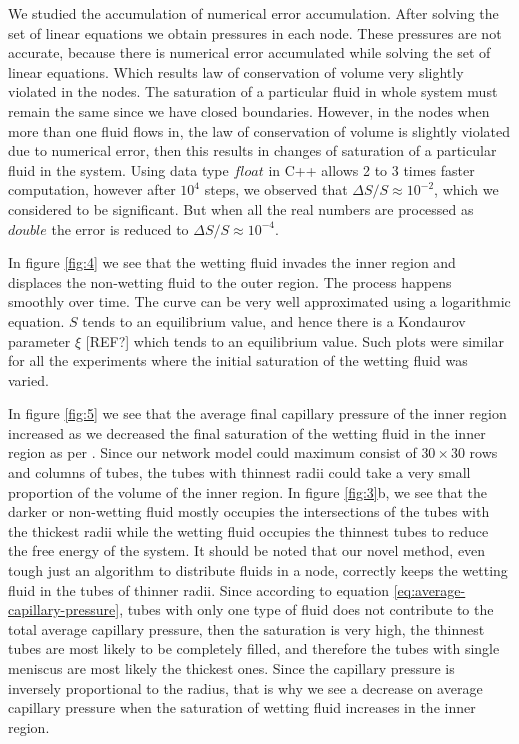 \documentclass[
	12pt
] {article}
\begin{document}
	We studied the accumulation of numerical error accumulation. After solving the set of linear equations we obtain pressures in each node. These pressures are not accurate, because there is numerical error accumulated while solving the set of linear equations. Which results law of conservation of volume very slightly violated in the nodes. The saturation of a particular fluid in whole system must remain the same since we have closed boundaries. However, in the nodes when more than one fluid flows in, the law of conservation of volume is slightly violated due to numerical error, then this results in changes of saturation of a particular fluid in the system. Using data type $float$ in C++ allows 2 to 3 times faster computation, however after $10^4$ steps, we observed that $\Delta S / S \approx 10^{-2}$, which we considered to be significant. But when all the real numbers are processed as $double$ the error is reduced to $\Delta S / S \approx 10^{-4}$.
	
	In figure \ref{fig:4} we see that the wetting fluid invades the inner region and displaces the non-wetting fluid to the outer region. The process happens smoothly over time. The curve can be very well approximated using a logarithmic equation. $S$ tends to an equilibrium value, and hence there is a Kondaurov parameter $\xi$ [REF?] which tends to an equilibrium value. Such plots were similar for all the experiments where the initial saturation of the wetting fluid was varied.
	
	In figure \ref{fig:5} we see that the average final capillary pressure of the inner region increased as we decreased the final saturation of the wetting fluid in the inner region as per \cite{fatt1956network}. Since our network model could maximum consist of $30 \times 30$ rows and columns of tubes, the tubes with thinnest radii could take a very small proportion of the volume of the inner region. In figure \ref{fig:3}b, we see that the darker or non-wetting fluid mostly occupies the intersections of the tubes with the thickest radii while the wetting fluid occupies the thinnest tubes to reduce the free energy of the system. It should be noted that our novel method, even tough just an algorithm to distribute fluids in a node, correctly keeps the wetting fluid in the tubes of thinner radii. Since according to equation \ref{eq:average-capillary-pressure}, tubes with only one type of fluid does not contribute to the total average capillary pressure, then the saturation is very high, the thinnest tubes are most likely to be completely filled, and therefore the tubes with single meniscus are most likely the thickest ones. Since the capillary pressure is inversely proportional to the radius, that is why we see a decrease on average capillary pressure when the saturation of wetting fluid increases in the inner region.
	
\end{document}
